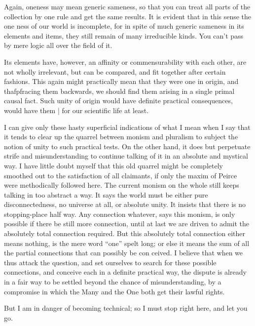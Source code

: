 \documentclass[]{article}
\begin{document}
Again, oneness may mean generic sameness, so that you can treat all parts of the collection by one rule and get the same results. It is evident that in this sense the one ness of our world is incomplete, for in spite of much generic sameness in its elements and items, they still remain of many irreducible kinds. You can't pass by mere logic all over the field of it. 

Its elements have, however, an affinity or commensurability with each other, are not wholly irrelevant, but can be compared, and fit together after certain fashions. This again might practically mean that they were one in origin, and thafpfracing them backwards, we should find them arising in a single primal causal fact. Such unity of origin would have definite practical consequences, would have them | for our scientific life at least. 

I can give only these hasty superficial indications of what I mean when I say that it tends to clear up the quarrel between monism and pluralism to subject the notion of unity to such practical tests. On the other hand, it does but perpetuate strife and misunderstanding to continue talking of it in an absolute and mystical way. I have little doubt myself that this old quarrel might be completely smoothed out to the satisfaction of all claimants, if only the maxim of Peirce were methodically followed here. The current monism on the whole still keeps talking in too abstract a way. It says the world must be either pure disconnectedness, no universe at all, or absolute unity. It insists that there is no stopping-place half way. Any connection whatever, says this monism, is only possible if there be still more connection, until at last we are driven to admit the absolutely total connection required. But this absolutely total connection either means nothing, is the mere word ``one'' spelt long; or else it means the sum of all the partial connections that can possibly be con ceived. I believe that when we thus attack the question, and set ourselves to search for these possible connections, and conceive each in a definite practical way, the dispute is already in a fair way to be settled beyond the chance of misunderstanding, by a compromise in which the Many and the One both get their lawful rights. 

But I am in danger of becoming technical; so I must stop right here, and let you go. 
\end{document}
